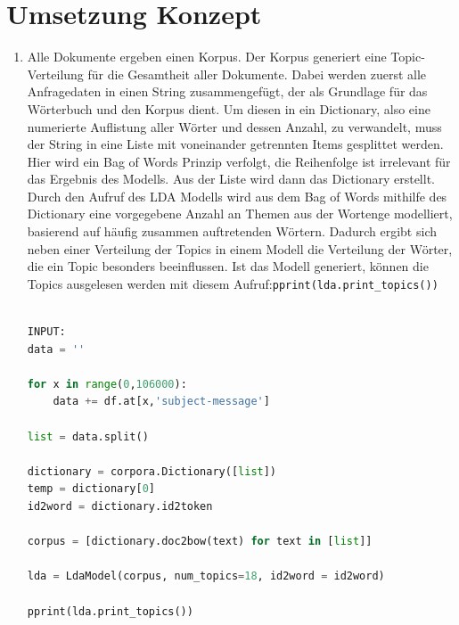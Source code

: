 \documentclass[german,version-2020-11]{uzl-thesis}
\begin{document}
\section{Umsetzung Konzept}

\begin{enumerate}
\item
Alle Dokumente ergeben einen Korpus. Der Korpus generiert eine Topic-Verteilung für die Gesamtheit aller Dokumente. Dabei werden zuerst alle Anfragedaten in einen String zusammengefügt, der als Grundlage für das Wörterbuch und den Korpus dient. Um diesen in ein Dictionary, also eine numerierte Auflistung aller Wörter und dessen Anzahl, zu verwandelt, muss der String in eine Liste mit voneinander getrennten Items gesplittet werden. Hier wird ein Bag of Words Prinzip verfolgt, die Reihenfolge ist irrelevant für das Ergebnis des Modells. Aus der Liste wird dann das Dictionary erstellt. Durch den Aufruf des LDA Modells wird aus dem Bag of Words mithilfe des Dictionary eine vorgegebene Anzahl an Themen aus der Wortenge modelliert, basierend auf häufig zusammen auftretenden Wörtern. Dadurch ergibt sich neben einer Verteilung der Topics in einem Modell die Verteilung der Wörter, die ein Topic besonders beeinflussen. Ist das Modell generiert, können die Topics ausgelesen werden mit diesem Aufruf:\lstinline{pprint(lda.print_topics())}\\
\\

\begin{lstlisting}[language=Python, basicstyle=\small]
INPUT:
data = ''

for x in range(0,106000):
    data += df.at[x,'subject-message']

list = data.split()

dictionary = corpora.Dictionary([list])
temp = dictionary[0]
id2word = dictionary.id2token

corpus = [dictionary.doc2bow(text) for text in [list]]

lda = LdaModel(corpus, num_topics=18, id2word = id2word)

pprint(lda.print_topics())


\end{lstlisting}
\end{enumerate}
\end{document}

